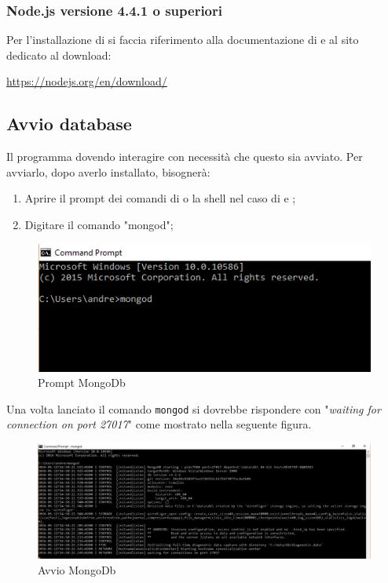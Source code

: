 \documentclass[12pt,a4paper]{article}
\begin{document}
		\subsubsection{Node.js versione 4.4.1 o superiori}
		Per l'installazione di  si faccia riferimento alla documentazione di  e al sito dedicato al download:
		\begin{center} \url{https://nodejs.org/en/download/} 
		\end{center}
	\subsection{Avvio database}
	Il programma dovendo interagire con  necessità che questo sia avviato. Per avviarlo, dopo averlo installato, bisognerà:
	\begin{enumerate}
		\item Aprire il prompt dei comandi di  o la shell nel caso di  e ;
		\item Digitare il comando "mongod";
	\end{enumerate}
	\begin{center}
		\begin{figure}[H]
			\centering \includegraphics[max width=\textwidth]{../img/manualeSviluppatore/mongod.png}
			\caption{Prompt MongoDb}
		\end{figure}
	\end{center}
	Una volta lanciato il comando \texttt{mongod} si  dovrebbe rispondere con "\textit{waiting for connection on port 27017}" come mostrato nella seguente figura.
	\begin{center}
		\begin{figure}[H]
			\centering 
			\includegraphics[max width=\textwidth]{../img/manualeSviluppatore/mongodRunning.png}
			\caption{Avvio MongoDb}
		\end{figure}
	\end{center}
	
\end{document}
